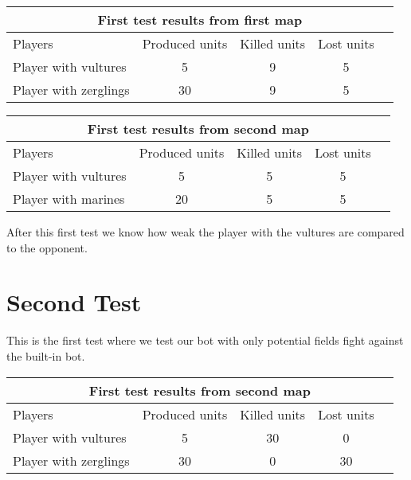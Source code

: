 \begin{centering}
 \begin{tabular}{|l||c|c|c|c|}
	\multicolumn{5}{c}{First test results from first map} \\
	\hline
	Players & Produced units & Killed units & Lost units\\
	\hline
	\hline
		Player with vultures & 5 & 9 & 5 \\
	\hline
		Player with zerglings & 30 & 9 & 5\\
	\hline

\end{tabular}
\end{centering}
\begin{centering}
 \begin{tabular}{|l||c|c|c|c|}
	\multicolumn{5}{c}{First test results from second map} \\
	\hline
	Players & Produced units & Killed units & Lost units\\
	\hline
		Player with vultures & 5 & 5 & 5\\
	\hline
		Player with marines & 20 & 5 & 5\\
	\hline

\end{tabular}
\end{centering}

After this first test we know how weak the player with the vultures are compared to the opponent.
\newpage
\section{Second Test} %
This is the first test where we test our bot with only potential fields fight against the built-in bot.\\

\begin{centering}
 \begin{tabular}{|l||c|c|c|c|}
	\multicolumn{5}{c}{First test results from second map} \\
	\hline
	Players & Produced units & Killed units & Lost units\\
	\hline
	\hline
		Player with vultures & 5 & 30 & 0\\
	\hline
		Player with zerglings & 30 & 0 & 30\\
	\hline

\end{tabular}
\end{centering}

